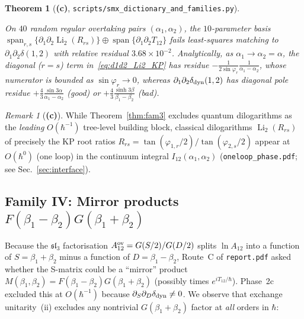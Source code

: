 \documentclass[11pt,a4paper]{article}
\newcommand{\Lc}{\textsf{\textbf{(c)}}}
\newcommand{\script}[1]{\texttt{scripts/\allowbreak #1}}
\DeclareMathOperator{\Li}{Li}
\newtheorem{theorem}[proposition]{Theorem}
\theoremstyle{remark}
\newtheorem{remark}[proposition]{Remark}
\begin{document}
\begin{theorem}[\Lc, \script{smx\_dictionary\_and\_families.py}]
\begin{enumerate}
\begin{equation}
\end{equation}
On $40$ random regular overtaking pairs $(\alpha_1,\alpha_2)$, the $10$-parameter basis $\operatorname{span}_{r,s}\{\partial_1\partial_2\Li_2(R_{rs})\}\oplus\operatorname{span}\{\partial_1\partial_2 T_{12}\}$ fails least-squares matching to $\partial_1\partial_2\delta(1,2)$ with relative residual $3.68\times 10^{-2}$. Analytically, as $\alpha_1\to\alpha_2=\alpha$, the diagonal ($r=s$) term in~\eqref{eq:d1d2_Li2_KP} has residue $-\frac{1}{2\sin\varphi_r}\frac{1}{\alpha_1-\alpha_2}$, whose numerator is bounded as $\sin\varphi_r\to 0$, whereas $\partial_1\partial_2\delta_{\rm dyn}(1,2)$ has diagonal pole residue $+\frac{4}{3}\frac{\sin 3\alpha}{\alpha_1-\alpha_2}$ (good) or $+\frac{4}{3}\frac{\sinh 3\beta}{\beta_1-\beta_2}$ (bad).
\end{enumerate}
\end{theorem}

\begin{remark}[\Lc]\label{rem:dilog_1loop}
While Theorem~\ref{thm:fam3} excludes quantum dilogarithms as the \emph{leading} $O(\hbar^{-1})$ tree-level building block, classical dilogarithms $\Li_2(R_{rs})$ of precisely the KP root ratios $R_{rs}=\tan(\varphi_{1,r}/2)/\tan(\varphi_{2,s}/2)$ appear at $O(\hbar^0)$ (one loop) in the continuum integral $I_{12}(\alpha_1,\alpha_2)$ (\texttt{oneloop\_phase.pdf}; see Sec.~\ref{sec:interface}).
\end{remark}

\subsection{Family IV: Mirror products \texorpdfstring{$F(\beta_1-\beta_2)G(\beta_1+\beta_2)$}{F(b1-b2)G(b1+b2)}}
Because the $\mathfrak{sl}_3$ factorisation $A_{12}^{\rm ov}=G(S/2)/G(D/2)$ splits $\ln A_{12}$ into a function of $S=\beta_1+\beta_2$ minus a function of $D=\beta_1-\beta_2$, Route~C of \texttt{report.pdf} asked whether the S-matrix could be a ``mirror'' product $M(\beta_1,\beta_2)=F(\beta_1-\beta_2)G(\beta_1+\beta_2)$ (possibly times $e^{iT_{12}/\hbar}$). Phase~2c excluded this at $O(\hbar^{-1})$ because $\partial_S\partial_D\delta_{\rm dyn}\neq 0$. We observe that exchange unitarity~(ii) excludes any nontrivial $G(\beta_1+\beta_2)$ factor at \emph{all} orders in $\hbar$:
\end{document}
